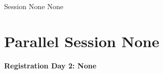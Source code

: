 \clearpage
{}
\begin{ThreeSessionOverview}{Session None}{\daydateyear}
  {None}
\end{ThreeSessionOverview}

\newpage
\section*{Parallel Session None}
{\bfseries\large Registration Day 2: None}\\
\TrackALoc\hfill\sessionchair{}{}
\clearpage


